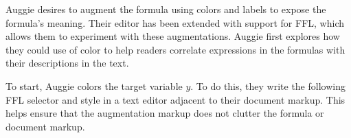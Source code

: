 Auggie desires to augment the formula using colors and labels to expose the formula's meaning. Their editor has been extended with support for FFL, which allows them to experiment with these augmentations. Auggie first explores how they could use of color to help readers correlate expressions in the formulas with their descriptions in the text.

To start, Auggie colors the target variable $y$. To do this, they write the following FFL selector and style in a text editor adjacent to their document markup. This helps ensure that the augmentation markup does not clutter the formula or document markup. \\[1ex]

